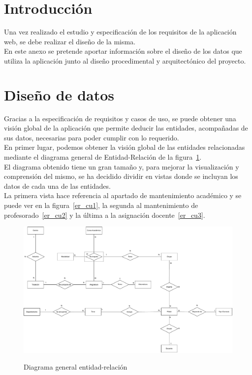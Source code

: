 
\section{Introducción}
Una vez realizado el estudio y especificación de los requisitos de la aplicación web, se debe realizar el diseño de la misma.\\
En este anexo se pretende aportar información sobre el diseño de los datos que utiliza la aplicación junto al diseño procedimental y arquitectónico del proyecto.

\section{Diseño de datos}
Gracias a la especificación de requisitos y casos de uso, se puede obtener una visión global de la aplicación que permite deducir las entidades, acompañadas de sus datos, necesarias para poder cumplir con lo requerido.\\
En primer lugar, podemos obtener la visión global de las entidades relacionadas mediante el diagrama general de Entidad-Relación de la figura~\ref{DiagramaGeneralE-R}.\\
El diagrama obtenido tiene un gran tamaño y, para mejorar la visualización y comprensión del mismo, se ha decidido dividir en vistas donde se incluyan los datos de cada una de las entidades.\\
La primera vista hace referencia al apartado de mantenimiento académico y se puede ver en la figura~\ref{er_cu1}, la segunda al mantenimiento de profesorado~\ref{er_cu2} y la última a la asignación docente~\ref{er_cu3}.

\begin{landscape}
	\begin{figure}[h]
		\caption{Diagrama general entidad-relación}
		\centering
		\includegraphics[scale=0.65]{../img/Anexos/Diagrama E-R.pdf}
		\label{DiagramaGeneralE-R}
	\end{figure}
\end{landscape}

